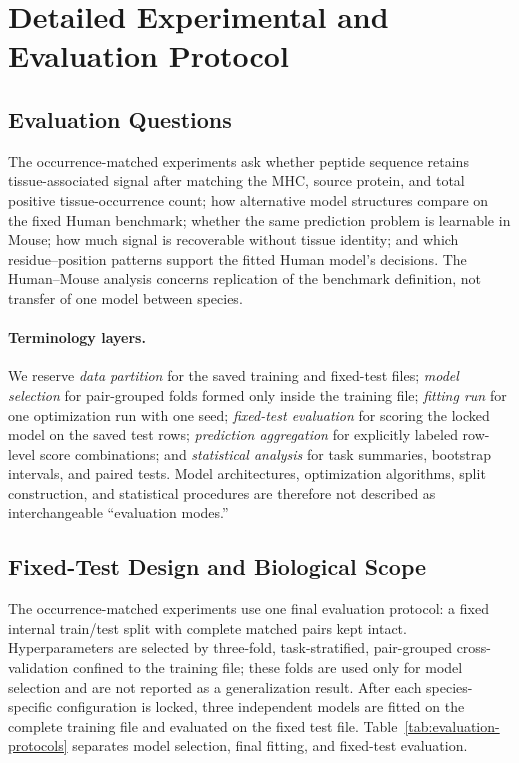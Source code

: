 \section{Detailed Experimental and Evaluation Protocol}
\label{sec:detailed-evaluation}

\subsection{Evaluation Questions}

The occurrence-matched experiments ask whether peptide sequence retains tissue-associated signal after matching the MHC, source protein, and total positive tissue-occurrence count; how alternative model structures compare on the fixed Human benchmark; whether the same prediction problem is learnable in Mouse; how much signal is recoverable without tissue identity; and which residue--position patterns support the fitted Human model's decisions. The Human--Mouse analysis concerns replication of the benchmark definition, not transfer of one model between species.

\paragraph{Terminology layers.}
We reserve \emph{data partition} for the saved training and fixed-test files; \emph{model selection} for pair-grouped folds formed only inside the training file; \emph{fitting run} for one optimization run with one seed; \emph{fixed-test evaluation} for scoring the locked model on the saved test rows; \emph{prediction aggregation} for explicitly labeled row-level score combinations; and \emph{statistical analysis} for task summaries, bootstrap intervals, and paired tests. Model architectures, optimization algorithms, split construction, and statistical procedures are therefore not described as interchangeable ``evaluation modes.''

\subsection{Fixed-Test Design and Biological Scope}

The occurrence-matched experiments use one final evaluation protocol: a fixed internal train/test split with complete matched pairs kept intact. Hyperparameters are selected by three-fold, task-stratified, pair-grouped cross-validation confined to the training file; these folds are used only for model selection and are not reported as a generalization result. After each species-specific configuration is locked, three independent models are fitted on the complete training file and evaluated on the fixed test file. Table~\ref{tab:evaluation-protocols} separates model selection, final fitting, and fixed-test evaluation.

